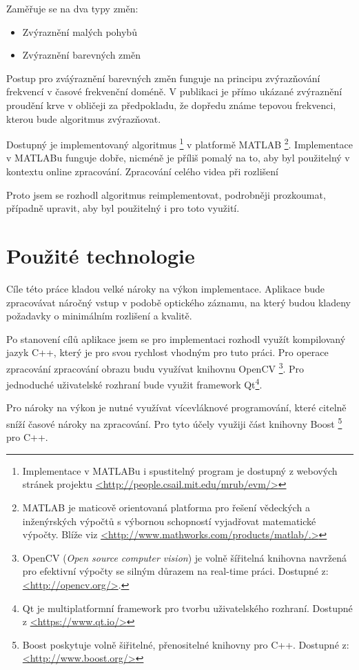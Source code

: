 \documentclass[
  digital, %
  table,   %
%
  lof,     %
  lot,     %
]{fithesis3}
\begin{document}
Zaměřuje se na dva typy změn:
\begin{itemize}
	\item Zvýraznění malých pohybů
    \item Zvýraznění barevných změn
\end{itemize}

Postup pro zváýraznění barevných změn funguje na principu zvýrazňování frekvencí v časové frekvenční doméně.
V publikaci je přímo ukázané zvýraznění proudění krve v obličeji za předpokladu, že dopředu známe tepovou frekvenci, kterou bude algoritmus zvýrazňovat.

Dostupný je implementovaný algoritmus
\footnote{Implementace v MATLABu i spustitelný program je dostupný z webových stránek projektu \url{<http://people.csail.mit.edu/mrub/evm/>}}
v platformě MATLAB
\footnote{MATLAB je maticově orientovaná platforma pro řešení vědeckých a inženýrských výpočtů s výbornou schopností vyjadřovat matematické výpočty. Blíže viz \url{<http://www.mathworks.com/products/matlab/.>}}.
Implementace v MATLABu funguje dobře, nicméně je příliš pomalý na to, aby byl použitelný v kontextu online zpracování. Zpracování celého videa při rozlišení

Proto jsem se rozhodl algoritmus reimplementovat, podrobněji prozkoumat, případně upravit, aby byl použitelný i pro toto využití.

\chapter{Použité technologie}
Cíle této práce kladou velké nároky na výkon implementace. Aplikace bude zpracovávat náročný vstup v podobě optického záznamu, na který budou kladeny požadavky o minimálním rozlišení a kvalitě.

Po stanovení cílů aplikace jsem se pro implementaci rozhodl využít kompilovaný jazyk C++, který je pro svou rychlost vhodným pro tuto práci. Pro operace zpracování zpracování obrazu budu využívat knihovnu OpenCV
\footnote{OpenCV (\emph{Open source computer vision}) je volně šířitelná knihovna navržená pro efektivní výpočty se silným důrazem na real-time práci. Dostupné z: \url{<http://opencv.org/>}.}.
Pro jednoduché uživatelské rozhraní bude využit framework Qt\footnote{Qt je multiplatformní framework pro tvorbu uživatelského rozhraní. Dostupné z \url{<https://www.qt.io/>}}.

Pro nároky na výkon je nutné využívat vícevláknové programování, které citelně sníží časové nároky na zpracování. Pro tyto účely využiji část knihovny Boost
\footnote{Boost poskytuje volně šiřitelné, přenositelné knihovny pro C++. Dostupné z: \url{<http://www.boost.org/>}}
pro C++.
\end{document}
